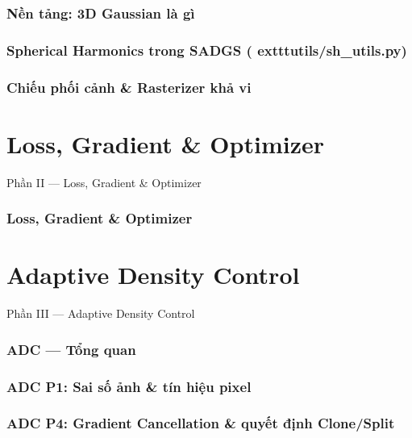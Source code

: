 \section{Nền tảng: 3D Gaussian là gì}


\section{Spherical Harmonics trong SADGS (	exttt{utils/sh\_utils.py})}


\section{Chiếu phối cảnh \& Rasterizer khả vi}


\part{Loss, Gradient \& Optimizer}
\begin{frame}{Phần II --- Loss, Gradient \& Optimizer}
\small
\tableofcontents
\end{frame}

\section{Loss, Gradient \& Optimizer}


\part{Adaptive Density Control}
\begin{frame}{Phần III --- Adaptive Density Control}
\small
\tableofcontents
\end{frame}

\section{ADC --- Tổng quan}


\section{ADC P1: Sai số ảnh \& tín hiệu pixel}



\section{ADC P4: Gradient Cancellation \& quyết định Clone/Split}



